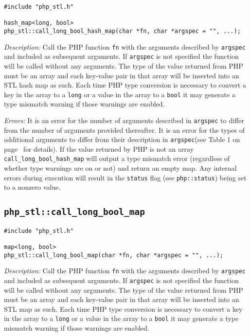 \documentclass[11pt,titlepage]{article}
\begin{document}
\begin{verbatim}
#include "php_stl.h"

hash_map<long, bool> 
php_stl::call_long_bool_hash_map(char *fn, char *argspec = "", ...);
\end{verbatim}

\emph{Description:} Call the PHP function \verb|fn| with the arguments described by \verb|argspec| and included as subsequent arguments. If \verb|argspec| is not specified the function will be called without any arguments. The type of the value returned from PHP must be an array and each key-value pair in that array will be inserted into an STL hash map as such. Each time PHP type conversion is necessary to convert a key in the array to a \verb|long| or a value in the array to a \verb|bool| it may generate a type mismatch warning if those warnings are enabled.

\emph{Errors:} It is an error for the number of arguments described in \verb|argspec| to differ from the number of arguments provided thereafter. It is an error for the types of additional arguments to differ from their description in \verb|argspec|(see Table 1 on page~\pageref{Table1} for details). If the value returned by PHP is not an array \verb|call_long_bool_hash_map| will output a type mismatch error (regardless of whether type warnings are on or not) and return an empty map. Any internal errors during execution will result in the \verb|status| flag (see \verb|php::status|) being set to a nonzero value.


\subsection{\texttt{php\_stl::call\_long\_bool\_map}}

\begin{verbatim}
#include "php_stl.h"

map<long, bool> 
php_stl::call_long_bool_map(char *fn, char *argspec = "", ...);
\end{verbatim}

\emph{Description:} Call the PHP function \verb|fn| with the arguments described by \verb|argspec| and included as subsequent arguments. If \verb|argspec| is not specified the function will be called without any arguments. The type of the value returned from PHP must be an array and each key-value pair in that array will be inserted into an STL map as such. Each time PHP type conversion is necessary to convert a key in the array to a \verb|long| or a value in the array to a \verb|bool| it may generate a type mismatch warning if those warnings are enabled.
\end{document}
